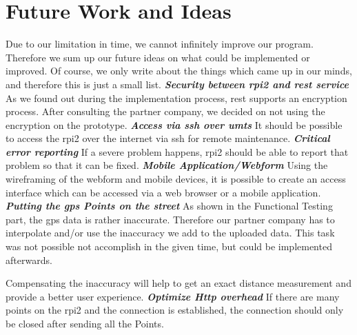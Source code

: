 \chapter{Future Work and Ideas}
Due to our limitation in time, we cannot infinitely improve our program. Therefore we sum up our future ideas on what could be implemented or improved. Of course, we only write about the things which came up in our minds, and therefore this is just a small list.
\newline \newline
\textbf{\textit{Security between \gls{rpi2} and \gls{rest} service}} \newline
As we found out during the implementation process, \gls{rest} supports an encryption process. After consulting the partner company, we decided on not using the encryption on the prototype.
\newline \newline
\textbf{\textit{Access via \gls{ssh} over \gls{umts}}}
\newline
It should be possible to access the \gls{rpi2} over the internet via \gls{ssh} for remote maintenance.
\newline \newline
\textbf{\textit{Critical error reporting}}
\newline
If a severe problem happens, \gls{rpi2} should be able to report that problem so that it can be fixed.
\newline \newline
\textbf{\textit{Mobile Application/Webform}}
\newline
Using the wireframing of the webform and mobile devices, it is possible to create an access interface which can be accessed via a web browser or a mobile application.
\newline \newline
\textbf{\textit{Putting the \gls{gps} Points on the street}}
\newline
As shown in the Functional Testing part, the \gls{gps} data is rather inaccurate. Therefore our partner company has to interpolate and/or use the inaccuracy we add to the uploaded data. This task was not possible not accomplish in the given time, but could be implemented afterwards.

Compensating the inaccuracy will help to get an exact distance measurement and provide a better user experience.
\newline \newline
\textbf{\textit{Optimize Http overhead}}
\newline
If there are many points on the \gls{rpi2}  and the connection is established, the connection should only be closed after sending all the Points.
